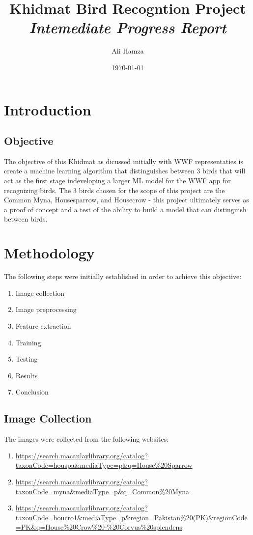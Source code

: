 \documentclass{article}
\title{Khidmat Bird Recogntion Project\\ \textit{Intemediate Progress Report}}
\author{Ali Hamza}
\date{\today}
\begin{document}
    \maketitle
    \section*{Introduction}
    \subsection*{Objective}
    The objective of this Khidmat as dicussed initially with WWF representaties is create a machine learning algorithm that distinguishes between 3 birds that will act as the first stage indeveloping a larger ML model for the WWF app for recognizing birds. The 3 birds chosen for the scope of this project are the Common Myna, Housesparrow, and Housecrow - this project ultimately serves as a proof of concept and a test of the ability to build a model that can distinguish between birds.

    \section*{Methodology}
    The following steps were initially established in order to achieve this objective:
    
    \begin{enumerate}
        \item Image collection
        \item Image preprocessing
        \item Feature extraction
        \item Training
        \item Testing
        \item Results
        \item Conclusion
    \end{enumerate}

    \subsection*{Image Collection}
    The images were collected from the following websites:
    \begin{enumerate}
        \item \url{https://search.macaulaylibrary.org/catalog?taxonCode=houspa&mediaType=p&q=House%20Sparrow}
        \item \url{https://search.macaulaylibrary.org/catalog?taxonCode=myna&mediaType=p&q=Common%20Myna}
        \item \url{https://search.macaulaylibrary.org/catalog?taxonCode=houcro1&mediaType=p&region=Pakistan%20(PK)&regionCode=PK&q=House%20Crow%20-%20Corvus%20splendens}
    \end{enumerate}
\end{document}
